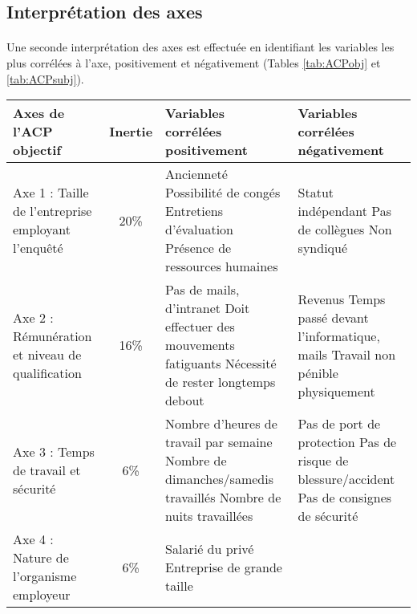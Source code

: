 \documentclass[11pt,fleqn,openany,frenchb]{book} %
\begin{document}
\subsection{Interprétation des axes}
\paragraph{}
Une seconde interprétation des axes est effectuée en identifiant les variables les plus corrélées à l'axe, positivement et négativement (Tables \ref{tab:ACPobj} et \ref{tab:ACPsubj}).

\begin{table}[!h]
\centering
\begin{tabular}{|p{3cm}|c|p{4.5cm}|p{4.5cm}|}
\hline
    Axes de l'ACP \newline objectif & Inertie &  Variables corrélées positivement & Variables corrélées négativement\\ 
    \hline
    Axe 1 : Taille de l'entreprise employant l'enquêté & 20\% & Ancienneté \newline Possibilité de congés \newline Entretiens d'évaluation \newline Présence de ressources humaines & Statut indépendant \newline Pas de collègues  \newline Non syndiqué \\
    \hline
    Axe 2 : Rémunération et niveau de qualification  & 16\%
    & Pas de mails, d'intranet 
    \newline Doit effectuer des mouvements fatiguants 
    \newline Nécessité de rester longtemps debout 
    & Revenus 
    \newline Temps passé devant l'informatique, mails 
    \newline Travail non pénible physiquement\\
    \hline
    Axe 3 : Temps de travail et sécurité & 6\% &  
    Nombre d'heures de travail par semaine 
    \newline Nombre de dimanches/samedis travaillés
    \newline Nombre de nuits travaillées
    & Pas de port de protection
    \newline Pas de risque de blessure/accident
    \newline Pas de consignes de sécurité\\
    \hline
    Axe 4 : Nature de l'organisme employeur & 6\%
    & Salarié du privé
    \newline Entreprise de grande taille

\end{tabular}
\end{table}
\end{document}
